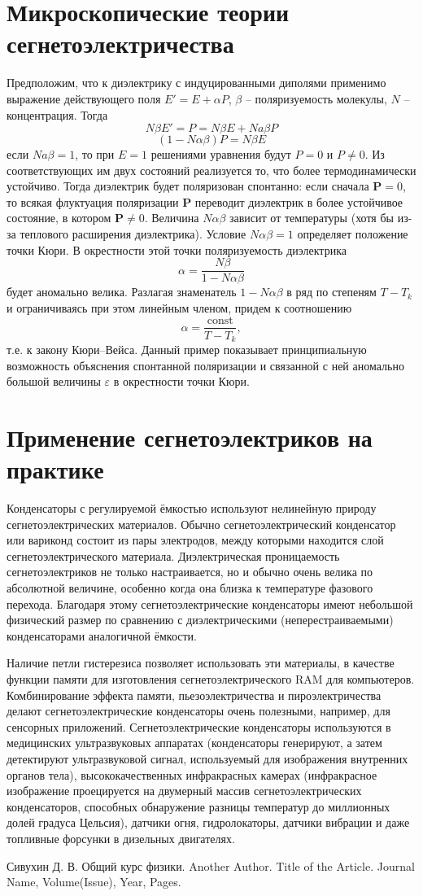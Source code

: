 \documentclass[12pt]{article}
\begin{document}
\section{Микроскопические теории сегнетоэлектричества}
Предположим, что к диэлектрику с индуцированными диполями применимо выражение действующего поля $E' = E + \alpha P$, $\beta$ -- поляризуемость молекулы, $N$ -- концентрация. Тогда
\[
N \beta E' = P = N \beta E + N a \beta P
\]
\[
(1-N \alpha \beta)P = N \beta E
\]
если $Na\beta = 1$, то при $E = 1$ решениями уравнения будут $P = 0$ и $P \ne 0$. Из соответствующих им двух состояний реализуется то, что более термодинамически устойчиво. Тогда диэлектрик будет поляризован спонтанно: если сначала $\mathbf{P} = 0$, то всякая флуктуация поляризации $\mathbf{P}$ переводит диэлектрик в более устойчивое состояние, в котором $\mathbf{P} \neq 0$. Величина $N \alpha \beta$ зависит от температуры (хотя бы из-за теплового расширения диэлектрика). Условие $N \alpha \beta = 1$ определяет положение точки Кюри. В окрестности этой точки поляризуемость диэлектрика 
\[
\alpha = \frac{N \beta}{1 - N \alpha \beta}
\]
будет аномально велика. Разлагая знаменатель $1 - N \alpha \beta$ в ряд по степеням $T - T_k$ и ограничиваясь при этом линейным членом, придем к соотношению 
\[
\alpha = \frac{\text{const}}{T - T_k},
\]
т.е. к закону Кюри--Вейса. Данный пример показывает принципиальную возможность объяснения спонтанной поляризации и связанной с ней аномально большой величины $\varepsilon$ в окрестности точки Кюри.
\section{Применение сегнетоэлектриков на практике}

Конденсаторы с регулируемой ёмкостью используют нелинейную природу сегнетоэлектрических материалов. Обычно сегнетоэлектрический конденсатор или вариконд состоит из пары электродов, между которыми находится слой сегнетоэлектрического материала. Диэлектрическая проницаемость сегнетоэлектриков не только настраивается, но и обычно очень велика по абсолютной величине, особенно когда она близка к температуре фазового перехода. Благодаря этому сегнетоэлектрические конденсаторы имеют небольшой физический размер по сравнению с диэлектрическими (неперестраиваемыми) конденсаторами аналогичной ёмкости.

Наличие петли гистерезиса позволяет использовать эти материалы, в качестве функции памяти для изготовления сегнетоэлектрического RAM для компьютеров.
Комбинирование эффекта памяти, пьезоэлектричества и пироэлектричества делают сегнетоэлектрические конденсаторы очень полезными, например, для сенсорных приложений. Сегнетоэлектрические конденсаторы используются в медицинских ультразвуковых аппаратах (конденсаторы генерируют, а затем детектируют ультразвуковой сигнал, используемый для изображения внутренних органов тела), высококачественных инфракрасных камерах (инфракрасное изображение проецируется на двумерный массив сегнетоэлектрических конденсаторов, способных обнаружение разницы температур до миллионных долей градуса Цельсия), датчики огня, гидролокаторы, датчики вибрации и даже топливные форсунки в дизельных двигателях.


\begin{thebibliography}{99}
     Сивухин Д. В. Общий курс физики. 
     Another Author. Title of the Article. Journal Name, Volume(Issue), Year, Pages.
\end{thebibliography}
\end{document}
